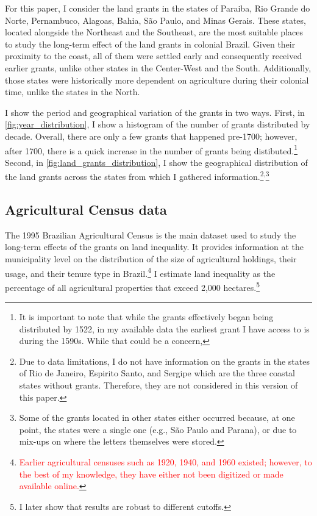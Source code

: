 \documentclass[11pt]{article}
\newcommand{\red}[1]{\textcolor{red}{#1}}
\begin{document}
For this paper, I consider the land grants in the states of Paraiba, Rio Grande do Norte, Pernambuco, Alagoas, Bahia, São Paulo, and Minas Gerais.
These states, located alongside the Northeast and the Southeast, are the most suitable places to study the long-term effect of the land grants in colonial Brazil.
Given their proximity to the coast, all of them were settled early and consequently received earlier grants, unlike other states in the Center-West and the South.
Additionally, those states were historically more dependent on agriculture during their colonial time, unlike the states in the North.

I show the period and geographical variation of the grants in two ways.
First, in \autoref{fig:year_distribution}, I show a histogram of the number of grants distributed by decade. 
Overall, there are only a few grants that happened pre-1700; however, after 1700, there is a quick increase in the number of grants being distibuted.\footnote{It is important to note that while the grants effectively began being distributed by 1522, in my available data the earliest grant I have access to is during the 1590s. While that could be a concern, }
Second, in \autoref{fig:land_grants_distribution}, I show the geographical distribution of the land grants across the states from which I gathered information.\footnote{Due to data limitations, I do not have information on the grants in the states of Rio de Janeiro, Espirito Santo, and Sergipe which are the three coastal states without grants. Therefore, they are not considered in this version of this paper.}\textsuperscript{,}\footnote{Some of the grants located in other states either occurred because, at one point, the states were a single one (e.g., São Paulo and Parana), or due to mix-ups on where the letters themselves were stored.}


\subsection{Agricultural Census data}

The 1995 Brazilian Agricultural Census is the main dataset used to study the long-term effects of the grants on land inequality.
It provides information at the municipality level on the distribution of the size of agricultural holdings, their usage, and their tenure type in Brazil.\footnote{\red{Earlier agricultural censuses such as 1920, 1940, and 1960 existed; however, to the best of my knowledge, they have either not been digitized or made available online.}}
I estimate land inequality as the percentage of all agricultural properties that exceed 2,000 hectares.\footnote{I later show that results are robust to different cutoffs.}
\end{document}
